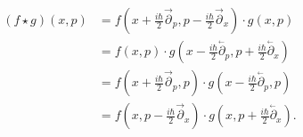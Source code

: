 

$${\begin{aligned}(f\star g)(x,p)&=f\left(x+{\tfrac {i\hbar }{2}}{\vec {\partial }}_{p},p-{\tfrac {i\hbar }{2}}{\vec {\partial }}_{x}\right)\cdot g(x,p)\\&=f(x,p)\cdot g\left(x-{\tfrac {i\hbar }{2}}{\overset {_{\gets }}{\partial }}_{p},p+{\tfrac {i\hbar }{2}}{\overset {_{\gets }}{\partial }}_{x}\right)\\&=f\left(x+{\tfrac {i\hbar }{2}}{\vec {\partial }}_{p},p\right)\cdot g\left(x-{\tfrac {i\hbar }{2}}{\overset {_{\gets }}{\partial }}_{p},p\right)\\&=f\left(x,p-{\tfrac {i\hbar }{2}}{\vec {\partial }}_{x}\right)\cdot g\left(x,p+{\tfrac {i\hbar }{2}}{\overset {_{\gets }}{\partial }}_{x}\right).\end{aligned}}$$
